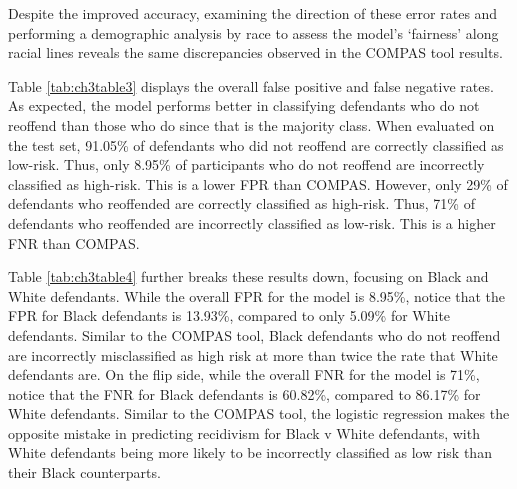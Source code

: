 \documentclass[12pt, twoside]{amherstthesis}
\begin{document}
Despite the improved accuracy, examining the direction of these error rates and performing a demographic analysis by race to assess the model's `fairness' along racial lines reveals the same discrepancies observed in the COMPAS tool results.

Table \ref{tab:ch3table3} displays the overall false positive and false negative rates. As expected, the model performs better in classifying defendants who do not reoffend than those who do since that is the majority class. When evaluated on the test set, 91.05\% of defendants who did not reoffend are correctly classified as low-risk. Thus, only 8.95\% of participants who do not reoffend are incorrectly classified as high-risk. This is a lower FPR than COMPAS. However, only 29\% of defendants who reoffended are correctly classified as high-risk. Thus, 71\% of defendants who reoffended are incorrectly classified as low-risk. This is a higher FNR than COMPAS.

Table \ref{tab:ch3table4} further breaks these results down, focusing on Black and White defendants. While the overall FPR for the model is 8.95\%, notice that the FPR for Black defendants is 13.93\%, compared to only 5.09\% for White defendants. Similar to the COMPAS tool, Black defendants who do not reoffend are incorrectly misclassified as high risk at more than twice the rate that White defendants are. On the flip side, while the overall FNR for the model is 71\%, notice that the FNR for Black defendants is 60.82\%, compared to 86.17\% for White defendants. Similar to the COMPAS tool, the logistic regression makes the opposite mistake in predicting recidivism for Black v White defendants, with White defendants being more likely to be incorrectly classified as low risk than their Black counterparts.
\end{document}
